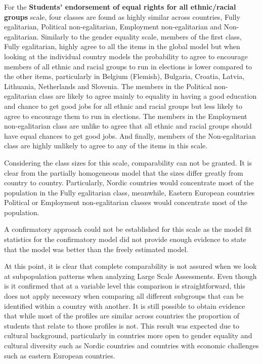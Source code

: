 \documentclass[12pt,a4paper,oneside]{reedthesis}
\begin{document}
For the \textbf{Students' endorsement of equal rights for all ethnic/racial groups} scale, four classes are found as highly similar across countries, Fully egalitarian, Political non-egalitarian, Employment non-egalitarian and Non-egalitarian. Similarly to the gender equality scale, members of the first class, Fully egalitarian, highly agree to all the items in the global model but when looking at the individual country models the probability to agree to encourage members of all ethnic and racial groups to run in elections is lower compared to the other items, particularly in Belgium (Flemish), Bulgaria, Croatia, Latvia, Lithuania, Netherlands and Slovenia. The members in the Political non-egalitarian class are likely to agree mainly to equality in having a good education and chance to get good jobs for all ethnic and racial groups but less likely to agree to encourage them to run in elections. The members in the Employment non-egalitarian class are unlike to agree that all ethnic and racial groups should have equal chances to get good jobs. And finally, members of the Non-egalitarian class are highly unlikely to agree to any of the items in this scale.

Considering the class sizes for this scale, comparability can not be granted. It is clear from the partially homogeneous model that the sizes differ greatly from country to country. Particularly, Nordic countries would concentrate most of the population in the Fully egalitarian class, meanwhile, Eastern European countries Political or Employment non-egalitarian classes would concentrate most of the population.

A confirmatory approach could not be established for this scale as the model fit statistics for the confirmatory model did not provide enough evidence to state that the model was better than the freely estimated model.

At this point, it is clear that complete comparability is not assured when we look at subpopulation patterns when analyzing Large Scale Assessments. Even though is it confirmed that at a variable level this comparison is straightforward, this does not apply necessary when comparing all different subgroups that can be identified within a country with another. It is still possible to obtain evidence that while most of the profiles are similar across countries the proportion of students that relate to those profiles is not. This result was expected due to cultural background, particularly in countries more open to gender equality and cultural diversity such as Nordic countries and countries with economic challenges such as eastern European countries.
\end{document}
